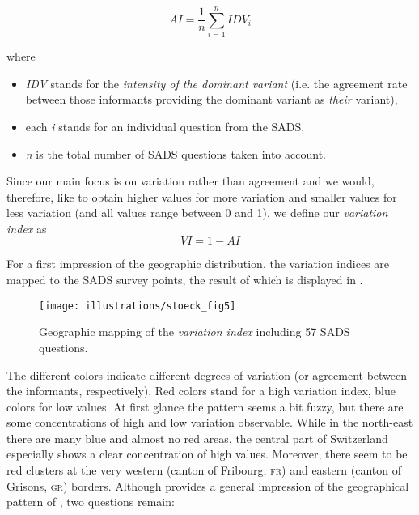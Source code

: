 \documentclass[output=paper]{LSP/langsci}
\begin{document}
\begin{equation}
\mathit{AI}=\frac{1}{n}\sum _{i=1}^{n}{{\mathit{IDV}}_{i}}
\end{equation}

where

\begin{itemize}
\item \emph{IDV} stands for the \emph{intensity of the dominant variant} (i.e. the agreement rate between those informants providing the dominant variant as \emph{their} variant),

\item each \emph{i} stands for an individual question from the SADS,

\item \emph{n} is the total number of SADS questions taken into account.

\end{itemize}

Since our main focus is on variation rather than agreement and we would, therefore, like to obtain higher values for more variation and smaller values for less variation (and all values range between 0 and 1), we define our \emph{variation index} as\\
\begin{equation}
\mathit{VI}=1-\mathit{AI}
\end{equation}

For a first impression of the geographic distribution, the variation indices are mapped to the SADS survey points, the result of which is displayed in .

\begin{figure}
\texttt{[image: illustrations/stoeck\_fig5]}
\caption{Geographic mapping of the \emph{variation index} including 57 SADS questions.}
\label{fig:stoeck:5}
\end{figure}

The different colors indicate different degrees of variation (or agreement between the informants, respectively). Red colors stand for a high variation index, blue colors for low values. At first glance the pattern seems a bit fuzzy, but there are some concentrations of high and low variation observable. While in the north-east there are many blue and almost no red areas, the central part of Switzerland especially shows a clear concentration of high values. Moreover, there seem to be red clusters at the very western (canton of Fribourg, \textsc{fr}) and eastern (canton of Grisons, \textsc{gr}) borders. Although  provides a general impression of the geographical pattern of , two questions remain:
\end{document}
